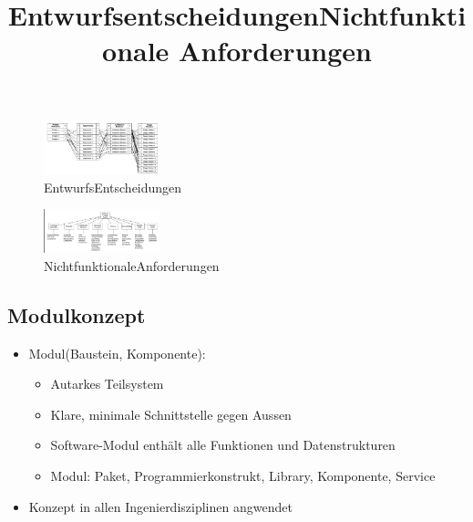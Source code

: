 \documentclass{article}
\begin{document}
\title{Entwurfsentscheidungen}
\begin{figure}[H]
\centering				\includegraphics[width=0.3\textwidth] {Resources/Images/EntwurfsEntscheidungen.png}
\caption{\label{fig:EntwurfsEntscheidungen}EntwurfsEntscheidungen}
\end{figure}

\title{Nichtfunktionale Anforderungen}
\begin{figure}[H]
\centering				\includegraphics[width=0.3\textwidth] {Resources/Images/NichtfunktionaleAnforderungen.png}
\caption{\label{fig:NichtfunktionaleAnforderungen}NichtfunktionaleAnforderungen}
\end{figure}

\subsection{Modulkonzept}
\begin{itemize}
	\item Modul(Baustein, Komponente):
	\begin{itemize}
		\item Autarkes Teilsystem
		\item Klare, minimale Schnittstelle gegen Aussen
		\item Software-Modul enthält alle Funktionen und Datenstrukturen
		\item Modul: Paket, Programmierkonstrukt, Library, Komponente, Service
	\end{itemize}
	\item Konzept in allen Ingenierdisziplinen angwendet
	
\end{itemize}
\end{document}
